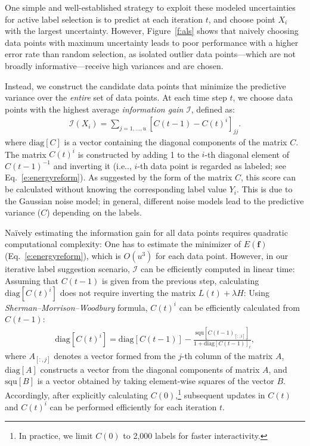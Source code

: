 \documentclass{article}
\makeatletter
\newcommand{\mbf}{\mathbf{f}}
\newcommand{\calI}{\mathcal{I}}
\DeclareRobustCommand\onedot{\futurelet\@let@token\@onedot}
\def\@onedot{\ifx\@let@token.\else.\null\fi\xspace}
\def\ie{{i.e}\onedot} \def\Ie{{I.e}\onedot}
\makeatother
\begin{document}
One simple and well-established strategy to exploit these modeled uncertainties for active label selection is to predict at each iteration $t$, and choose point $X_i$ with the largest uncertainty. However, Figure~\ref{f:als} shows that naively choosing data points with maximum uncertainty leads to poor performance with a higher error rate than random selection, as isolated outlier data points---which are not broadly informative---receive high variances and are chosen. 

Instead, we construct the candidate data points that minimize the predictive variance over the \emph{entire} set of data points. At each time step $t$, we choose data points with the highest average \emph{information gain} $\calI$, defined as:
\begin{align}
\calI(X_i) = \sum_{j=1,\ldots,u} [C(t-1)-C(t)^i]_{jj}.
\label{e:infogain}
\end{align}
where $\text{diag}[C]$ is a vector containing the diagonal components of the matrix $C$. The matrix $C(t)^i$ is constructed by adding 1 to the $i$-th diagonal element of $C(t-1)^{-1}$ and inverting it (\ie, $i$-th data point is regarded as labeled; see Eq.~\ref{e:energyreform}). As suggested by the form of the matrix $C$, this score can be calculated without knowing the corresponding label value $Y_i$. This is due to the Gaussian noise model; in general, different noise models lead to the predictive variance ($C$) depending on the labels.

Na\"{i}vely estimating the information gain for all data points requires quadratic computational complexity: One has to estimate the minimizer of $E(\mbf)$ (Eq.~\ref{e:energyreform}), which is $O(u^3)$ for each data point. However, in our iterative label suggestion scenario, $\calI$ can be efficiently computed in linear time: Assuming that $C(t-1)$ is given from the previous step, calculating $\text{diag}[C(t)^i]$ does not require inverting the matrix $L(t)+\lambda H$: Using \emph{Sherman--Morrison--Woodbury} formula, $C(t)^i$ can be efficiently calculated from $C(t-1)$:
\begin{align}
\text{diag}[C(t)^{i}]=\text{diag}[C(t-1)]-\frac{\text{squ}[C(t-1)_{[:,i]}]}{1+\text{diag}[C(t-1)]_{i}},
\label{e:rankoneupdate}
\end{align}
where $A_{[:,j]}$ denotes a vector formed from the $j$-th column of the matrix $A$, $\text{diag}[A]$ constructs a vector from the diagonal components of matrix $A$, and $\text{squ}[B]$ is a vector obtained by taking element-wise squares of the vector $B$. Accordingly, after explicitly calculating $C(0)$,\footnote{In practice, we limit $C(0)$ to 2,000 labels for faster interactivity.} subsequent updates in $C(t)$ and $C(t)^i$ can be performed efficiently for each iteration $t$.
\end{document}
